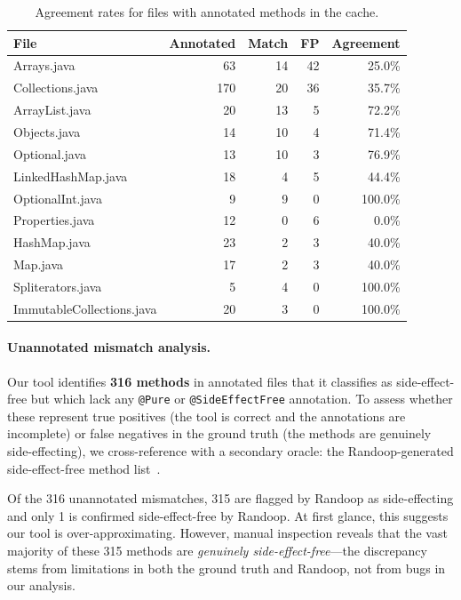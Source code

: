 \begin{table}[h]
\centering
\caption{Agreement rates for files with annotated methods in the cache.}
\label{tab:per-file}
\begin{tabular}{lrrrr}
\toprule
\textbf{File} & \textbf{Annotated} & \textbf{Match} & \textbf{FP} & \textbf{Agreement} \\
\midrule
Arrays.java               &  63 &  14 &  42 & 25.0\% \\
Collections.java          & 170 &  20 &  36 & 35.7\% \\
ArrayList.java            &  20 &  13 &   5 & 72.2\% \\
Objects.java              &  14 &  10 &   4 & 71.4\% \\
Optional.java             &  13 &  10 &   3 & 76.9\% \\
LinkedHashMap.java        &  18 &   4 &   5 & 44.4\% \\
OptionalInt.java          &   9 &   9 &   0 & 100.0\% \\
Properties.java           &  12 &   0 &   6 &  0.0\% \\
HashMap.java              &  23 &   2 &   3 & 40.0\% \\
Map.java                  &  17 &   2 &   3 & 40.0\% \\
Spliterators.java         &   5 &   4 &   0 & 100.0\% \\
ImmutableCollections.java &  20 &   3 &   0 & 100.0\% \\
\bottomrule
\end{tabular}
\end{table}


\paragraph{Unannotated mismatch analysis.}
Our tool identifies \textbf{316 methods} in annotated files that it classifies as side-effect-free but which lack any \texttt{@Pure} or \texttt{@SideEffectFree} annotation.
To assess whether these represent true positives (the tool is correct and the annotations are incomplete) or false negatives in the ground truth (the methods are genuinely side-effecting), we cross-reference with a secondary oracle: the Randoop-generated side-effect-free method list~\cite{randoop}.

Of the 316 unannotated mismatches, 315 are flagged by Randoop as side-effecting and only 1 is confirmed side-effect-free by Randoop.
At first glance, this suggests our tool is over-approximating.
However, manual inspection reveals that the vast majority of these 315 methods are \emph{genuinely side-effect-free}---the discrepancy stems from limitations in both the ground truth and Randoop, not from bugs in our analysis.

